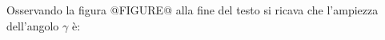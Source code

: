 Osservando la 
figura @FIGURE@ alla fine del testo
 si ricava che l'ampiezza 
dell'angolo $\gamma$ è: